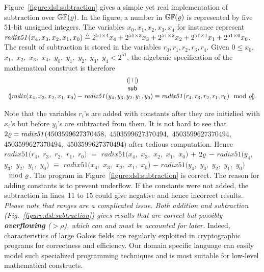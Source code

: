 Figure~\ref{figure:dsl:subtraction} gives a simple yet real
implementation of subtraction over $\mathbb{GF}(\varrho)$. 
In the figure, a number in $\mathbb{GF}(\varrho)$ 
is represented by five 51-bit unsigned integers. The variables
${x}_0, {x}_1, {x}_2, {x}_3, {x}_4$ for instance represent 
$\mathit{radix51}({x}_4, {x}_3, {x}_2, {x}_1, {x}_0) \triangleq
2^{51 \times 4} {x}_4 + 2^{51 \times 3} {x}_3 + 
2^{51 \times 2} {x}_2 + 2^{51 \times 1} {x}_1 + 
2^{51 \times 0} {x}_0$. The result of
subtraction is stored in the variables ${r}_0, {r}_1, {r}_2, {r}_3, {r}_4$. 
Given $0 \leq {x}_0,$ ${x}_1,$ ${x}_2,$ ${x}_3,$ ${x}_4,$ ${y}_0,$ 
${y}_1,$ ${y}_2,$ ${y}_3,$ ${y}_4 < 2^{51}$, 
the algebraic specification of the mathematical construct is therefore
\[
\begin{array}{c}
{(\!|}{\top}{|\!)}\\
\mbox{\textsf{sub}}\\
{(\!|}{\mathit{radix}({x}_4, {x}_3, {x}_2, {x}_1, {x}_0) -
\mathit{radix51}({y}_4, {y}_3, {y}_2, {y}_1, {y}_0)
\equiv
\mathit{radix51}({r}_4, {r}_3, {r}_2, {r}_1, {r}_0)
\mod {\varrho}
}{|\!)}.
\end{array}
\]

Note that the variables ${r}_i$'s are added with constants
after they are initizlied with ${x}_i$'s but before
${y}_i$'s are subtracted from them. It is not hard to see that
$2\varrho = \mathit{radix51} (4503599627370458,$ $4503599627370494,$
$4503599627370494,$ $4503599627370494,$ $4503599627370494)$
after tedious computation. Hence $\mathit{radix51}({r}_4,$
${r}_3,$ ${r}_2,$ ${r}_1,$ ${r}_0)$ $=$
$\mathit{radix51}({x}_4,$ ${x}_3,$ ${x}_2,$ ${x}_1,$ ${x}_0)$ $+$ 
$2 \varrho $ $-$
$\mathit{radix51}({y}_4,$ ${y}_3,$ ${y}_2,$ ${y}_1,$ ${y}_0)$ 
$\equiv $
$\mathit{radix51}({x}_4,$ ${x}_3,$ ${x}_2,$ ${x}_1,$ ${x}_0)$ $-$
$\mathit{radix51}({y}_4,$ ${y}_3,$ ${y}_2,$ ${y}_1,$ ${y}_0)$ $\mod 
{\varrho} $. The program in
Figure~\ref{figure:dsl:subtraction} is correct. The reason for
adding constants is to prevent underflow. If the constants were not
added, the subtraction in lines~11 to 15 could give negative and hence
%
incorrect results. \emph{Please note that ranges are a complicated
  issue.  Both addition and subtraction (Fig.~\ref{figure:dsl:subtraction}) gives results that are correct
  but possibly \textbf{overflowing} ($>\rho$), which can and must be
  accounted for later.} Indeed, characteristics of large Galois fields
are
%
regularly exploited in cryptographic programs for correctness and
efficiency. Our domain specific language can easily model such
specialized programming techniques and is most suitable for low-level
mathematical constructs.

